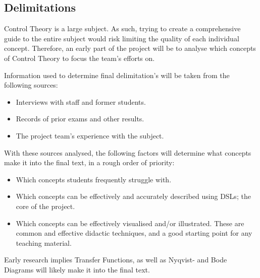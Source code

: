\subsection{Delimitations}\label{sec:delimitation}
Control Theory is a large subject. As such, trying to create a comprehensive guide to the entire subject would risk limiting the quality of each individual concept. Therefore, an early part of the project will be to analyse which concepts of Control Theory to focus the team's efforts on.

Information used to determine final delimitation's will be taken from the following sources:
\begin{itemize}
    \item Interviews with staff and former students.
    \item Records of prior exams and other results.
    \item The project team's experience with the subject.
\end{itemize}

With these sources analysed, the following factors will determine what concepts make it into the final text, in a rough order of priority:
\begin{itemize}
    \item Which concepts students frequently struggle with.
    \item Which concepts can be effectively and accurately described using DSLs\cite{DAT326}; the core of the project.
    \item Which concepts can be effectively visualised and/or illustrated. These are common and effective didactic techniques, and a good starting point for any teaching material.
\end{itemize}

Early research implies Transfer Functions, as well as Nyqvist- and Bode Diagrams will likely make it into the final text.

\iffalse
Avgränsningar: (slids)

Avgränsningarna ska ta upp vilka delar av det övergripande syftet som inte tas upp i arbetet, och anledningarna till detta. (Kan ingå i problem-/uppgiftsanalysen)


\fi